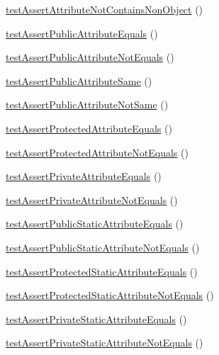 \begin{DoxyCompactItemize}
\item 
\mbox{\hyperlink{class_framework___assert_test_aaac1ec3258d7ae2727fd9a4e236e3074}{test\+Assert\+Attribute\+Not\+Contains\+Non\+Object}} ()
\item 
\mbox{\hyperlink{class_framework___assert_test_afda9c32011a1db042dbee3243b59508d}{test\+Assert\+Public\+Attribute\+Equals}} ()
\item 
\mbox{\hyperlink{class_framework___assert_test_af31c466afb654365321ed018b4ebed3f}{test\+Assert\+Public\+Attribute\+Not\+Equals}} ()
\item 
\mbox{\hyperlink{class_framework___assert_test_a11cc78fd8561b9dccb465692bbeeb42d}{test\+Assert\+Public\+Attribute\+Same}} ()
\item 
\mbox{\hyperlink{class_framework___assert_test_aa8e381c889136b6fe4736aa9ffba7b9a}{test\+Assert\+Public\+Attribute\+Not\+Same}} ()
\item 
\mbox{\hyperlink{class_framework___assert_test_a678807b9bea22b7cb1f78927feca32dd}{test\+Assert\+Protected\+Attribute\+Equals}} ()
\item 
\mbox{\hyperlink{class_framework___assert_test_ae8b1242b54840e4558476030f0c264d8}{test\+Assert\+Protected\+Attribute\+Not\+Equals}} ()
\item 
\mbox{\hyperlink{class_framework___assert_test_ab0ee04a99513b5e1a9258e2d02b72573}{test\+Assert\+Private\+Attribute\+Equals}} ()
\item 
\mbox{\hyperlink{class_framework___assert_test_ad94ea8c2a717cf7767847269974e89be}{test\+Assert\+Private\+Attribute\+Not\+Equals}} ()
\item 
\mbox{\hyperlink{class_framework___assert_test_af97dea72e2ca41844bed1b027cb9e44a}{test\+Assert\+Public\+Static\+Attribute\+Equals}} ()
\item 
\mbox{\hyperlink{class_framework___assert_test_a5557a52cb884857e398d7b44c0faca2b}{test\+Assert\+Public\+Static\+Attribute\+Not\+Equals}} ()
\item 
\mbox{\hyperlink{class_framework___assert_test_a777f5bd8e5aa11dde7db519c9f6473a8}{test\+Assert\+Protected\+Static\+Attribute\+Equals}} ()
\item 
\mbox{\hyperlink{class_framework___assert_test_a2863236bef70004026264e23037a7052}{test\+Assert\+Protected\+Static\+Attribute\+Not\+Equals}} ()
\item 
\mbox{\hyperlink{class_framework___assert_test_aa1bf4c6d033e7f437466d785a97f6022}{test\+Assert\+Private\+Static\+Attribute\+Equals}} ()
\item 
\mbox{\hyperlink{class_framework___assert_test_a5fed12fbd5fdc25d93209fe1334aece3}{test\+Assert\+Private\+Static\+Attribute\+Not\+Equals}} ()

\end{DoxyCompactItemize}

